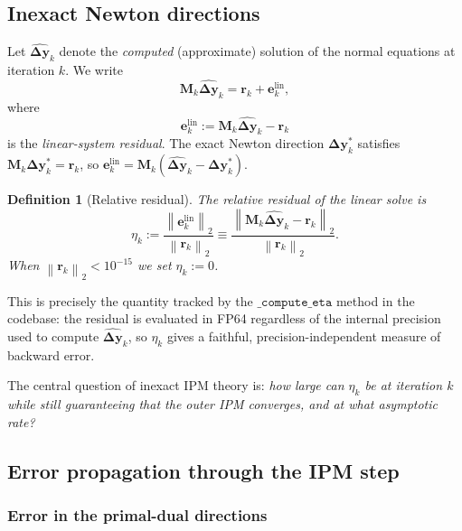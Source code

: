 \documentclass[11pt,twoside]{article}
\newtheorem{definition}{Definition}[section]
\newcommand{\by}{\mathbf{y}}
\newcommand{\be}{\mathbf{e}}
\newcommand{\bM}{\mathbf{M}}
\newcommand{\br}{\mathbf{r}}
\newcommand{\bDelta}{\mathbf{\Delta}}
\newcommand{\norm}[1]{\left\lVert#1\right\rVert}
\begin{document}
\subsection{Inexact Newton directions}

Let $\widehat{\bDelta\by}_k$ denote the \emph{computed} (approximate)
solution of the normal equations at iteration $k$.  We write
\begin{equation}
  \bM_k \widehat{\bDelta\by}_k = \br_k + \be_k^{\text{lin}},
  \label{eq:inexact-system}
\end{equation}
where
\begin{equation}
  \be_k^{\text{lin}} := \bM_k \widehat{\bDelta\by}_k - \br_k
  \label{eq:e-lin}
\end{equation}
is the \emph{linear-system residual}.  The exact Newton direction
$\bDelta\by_k^*$ satisfies $\bM_k\bDelta\by_k^* = \br_k$, so
$\be_k^{\text{lin}} = \bM_k(\widehat{\bDelta\by}_k - \bDelta\by_k^*)$.

\begin{definition}[Relative residual]
  \label{def:eta}
  The \emph{relative residual} of the linear solve is
  \begin{equation}
    \boxed{\eta_k :=
      \frac{\norm{\be_k^{\text{lin}}}_2}{\norm{\br_k}_2}
      \equiv
      \frac{\norm{\bM_k\widehat{\bDelta\by}_k - \br_k}_2}
           {\norm{\br_k}_2}}.
    \label{eq:eta-def}
  \end{equation}
  When $\norm{\br_k}_2 < 10^{-15}$ we set $\eta_k := 0$.
\end{definition}

This is precisely the quantity tracked by the $\texttt{\_compute\_eta}$
method in the codebase: the residual is evaluated in FP64 regardless of the
internal precision used to compute $\widehat{\bDelta\by}_k$, so $\eta_k$
gives a faithful, precision-independent measure of backward error.

The central question of inexact IPM theory is: \emph{how large can
$\eta_k$ be at iteration $k$ while still guaranteeing that the outer IPM
converges, and at what asymptotic rate?}

\subsection{Error propagation through the IPM step}
\label{sec:error-prop}

\subsubsection{Error in the primal-dual directions}
\end{document}
